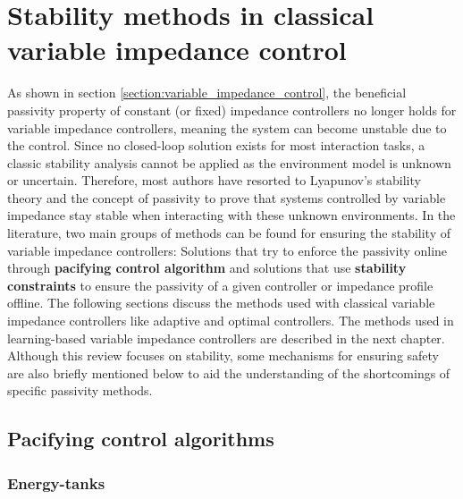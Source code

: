 \chapter{Stability methods in classical variable impedance control}
\label{chapter:classical_variable_impedance}

As shown in section \ref{section:variable_impedance_control}, the beneficial passivity property of constant (or fixed) impedance controllers no longer holds for variable impedance controllers, meaning the system can become unstable due to the control. Since no closed-loop solution exists for most interaction tasks, a classic stability analysis cannot be applied as the environment model is unknown or uncertain. Therefore, most authors have resorted to Lyapunov's stability theory and the concept of passivity to prove that systems controlled by variable impedance stay stable when interacting with these unknown environments. In the literature, two main groups of methods can be found for ensuring the stability of variable impedance controllers: Solutions that try to enforce the passivity online through \textbf{pacifying control algorithm} and solutions that use \textbf{stability constraints} to ensure the passivity of a given controller or impedance profile offline. The following sections discuss the methods used with classical variable impedance controllers like adaptive and optimal controllers. The methods used in learning-based variable impedance controllers are described in the next chapter. Although this review focuses on stability, some mechanisms for ensuring safety are also briefly mentioned below to aid the understanding of the shortcomings of specific passivity methods.

\section{Pacifying control algorithms}

\subsection{Energy-tanks}

